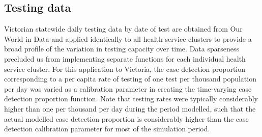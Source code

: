 \subsection{Testing data}
Victorian statewide daily testing data by date of test are obtained from Our World in Data and applied identically to all health service clusters to provide a broad profile of the variation in testing capacity over time. Data sparseness precluded us from implementing separate functions for each individual health service cluster. For this application to Victoria, the case detection proportion corresponding to a per capita rate of testing of one test per thousand population per day was varied as a calibration parameter in creating the time-varying case detection proportion function. Note that testing rates were typically considerably higher than one per thousand per day during the period modelled, such that the actual modelled case detection proportion is considerably higher than the case detection calibration parameter for most of the simulation period.